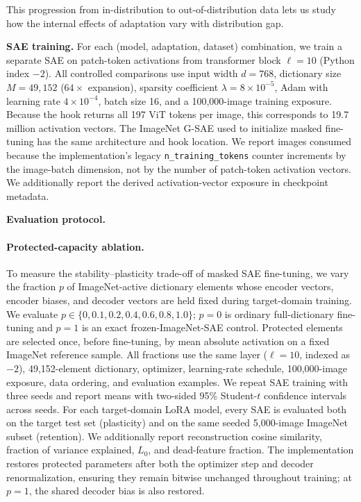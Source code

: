 This progression from in-distribution to out-of-distribution data lets us study how the internal effects of adaptation vary with distribution gap.

\textbf{SAE training.}
For each (model, adaptation, dataset) combination, we train a separate SAE on
patch-token activations from transformer block $\ell{=}10$ (Python index $-2$).
All controlled comparisons use input width $d{=}768$, dictionary size
$M{=}49{,}152$ ($64\times$ expansion), sparsity coefficient
$\lambda{=}8\times10^{-5}$, Adam with learning rate $4\times10^{-4}$, batch
size 16, and a 100,000-image training exposure. Because the hook returns all
197 ViT tokens per image, this corresponds to 19.7 million activation vectors.
The ImageNet G-SAE used to
initialize masked fine-tuning has the same architecture and hook location.
We report images consumed because the implementation's legacy
\texttt{n\_training\_tokens} counter increments by the image-batch dimension,
not by the number of patch-token activation vectors. We additionally report
the derived activation-vector exposure in checkpoint metadata.

\textbf{Evaluation protocol.}

\paragraph{Protected-capacity ablation.}
To measure the stability--plasticity trade-off of masked SAE fine-tuning, we
vary the fraction $p$ of ImageNet-active dictionary elements whose encoder
vectors, encoder biases, and decoder vectors are held fixed during target-domain
training. We evaluate $p\in\{0,0.1,0.2,0.4,0.6,0.8,1.0\}$; $p=0$ is ordinary
full-dictionary fine-tuning and $p=1$ is an exact frozen-ImageNet-SAE control.
Protected elements are selected once, before
fine-tuning, by mean absolute activation on a fixed ImageNet reference sample.
All fractions use the same layer ($\ell=10$, indexed as $-2$), 49,152-element
dictionary, optimizer, learning-rate schedule, 100,000-image exposure, data
ordering, and evaluation examples. We repeat SAE training with three seeds and
report means with two-sided 95\% Student-$t$ confidence intervals across seeds.
For each target-domain LoRA model, every SAE is evaluated both on the target
test set (plasticity) and on the same seeded 5,000-image ImageNet subset
(retention). We additionally report reconstruction cosine similarity, fraction
of variance explained, $L_0$, and dead-feature fraction. The implementation
restores protected parameters after both the optimizer step and decoder
renormalization, ensuring they remain bitwise unchanged throughout training;
at $p=1$, the shared decoder bias is also restored.

